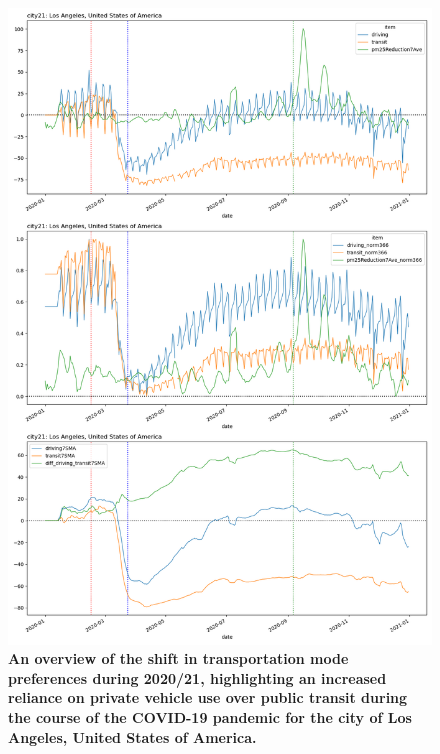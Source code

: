 \documentclass[preprint,12pt]{elsarticle}
\begin{document}




\begin{figure}
\centering
\includegraphics[trim={0 895 0 0},clip,scale=0.45]{Images/LA_Drive_trans.png}
\caption{\bf An overview of the shift in transportation mode preferences during 2020/21, highlighting an increased reliance on private vehicle use over public transit during the course of the COVID-19 pandemic for the city of Los Angeles, United States of America.}  
 \label{fig:LAdriv_trans}
\end{figure}
\end{document}
